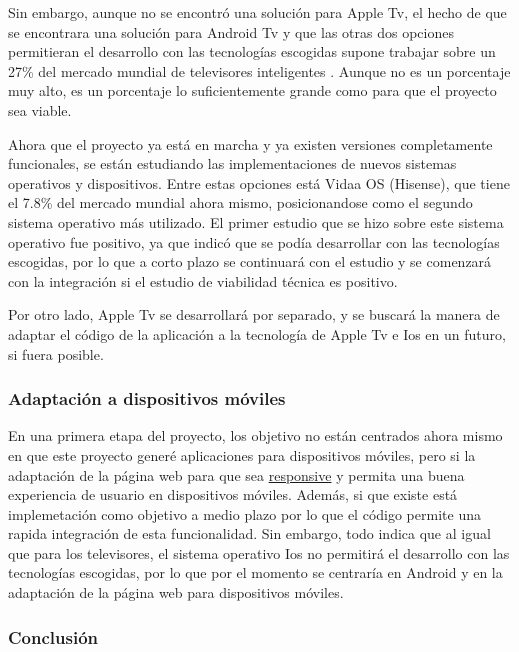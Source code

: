 Sin embargo, aunque no se encontró una solución para Apple Tv, el hecho de que se encontrara una solución para
Android Tv y que las otras dos opciones permitieran el desarrollo con las tecnologías escogidas supone 
trabajar sobre un 27\% del mercado mundial de televisores inteligentes \cite{smarttv_marketshare}. Aunque no es
un porcentaje muy alto, es un porcentaje lo suficientemente grande como para que el proyecto sea viable.

Ahora que el proyecto ya está en marcha y ya existen versiones completamente funcionales, se están estudiando
las implementaciones de nuevos sistemas operativos y dispositivos. Entre estas opciones está Vidaa OS (Hisense), que 
tiene el 7.8\% del mercado mundial ahora mismo, posicionandose como el segundo sistema operativo más utilizado. El 
primer estudio que se hizo sobre este sistema operativo fue positivo, ya que indicó que se podía desarrollar con las
tecnologías escogidas, por lo que a corto plazo se continuará con el estudio y se comenzará con la integración
si el estudio de viabilidad técnica es positivo.

Por otro lado, Apple Tv se desarrollará por separado, y se buscará la manera de adaptar el código de la aplicación 
a la tecnología de Apple Tv e Ios en un futuro, si fuera posible. 

\subsubsection{Adaptación a dispositivos móviles}
\label{subsubsec:analisis_estudio_viabilidad_tecnica_aplicacion_movil}

En una primera etapa del proyecto, los objetivo no están centrados ahora mismo en que este proyecto generé aplicaciones
para dispositivos móviles, pero si la adaptación de la página web para que sea \href{https://es.wikipedia.org/wiki/Dise%C3%B1o_web_adaptable}{responsive}
y permita una buena experiencia de usuario en dispositivos móviles. Además, si que existe está implemetación como objetivo
a medio plazo por lo que el código permite una rapida integración de esta funcionalidad. Sin embargo, todo indica que
al igual que para los televisores, el sistema operativo Ios no permitirá el desarrollo con las tecnologías escogidas, por
lo que por el momento se centraría en Android y en la adaptación de la página web para dispositivos móviles.



\subsubsection{Conclusión}
\label{subsubsec:analisis_estudio_viabilidad_tecnica_conclusion}

